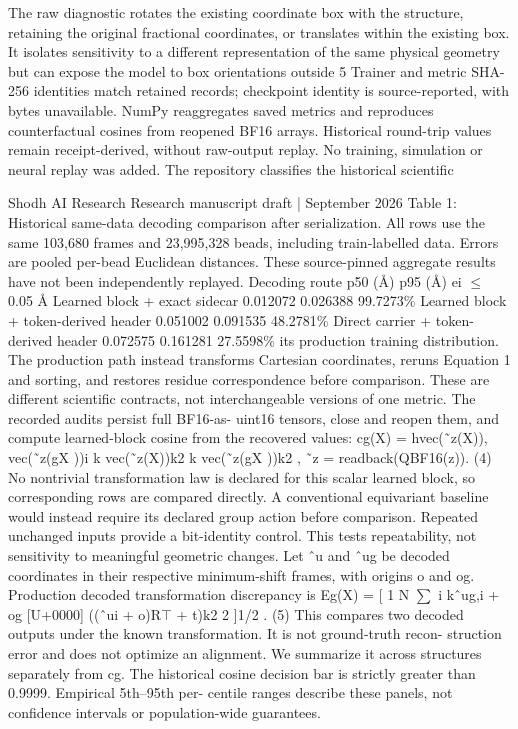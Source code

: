 \documentclass[11pt]{article}
\begin{document}
The raw diagnostic rotates the existing coordinate box with the structure, retaining the original
fractional coordinates, or translates within the existing box. It isolates sensitivity to a different
representation of the same physical geometry but can expose the model to box orientations outside
5
Trainer and metric SHA-256 identities match retained records; checkpoint identity is
source-reported, with bytes unavailable. NumPy reaggregates saved metrics and reproduces
counterfactual cosines from reopened BF16 arrays. Historical round-trip values remain
receipt-derived, without raw-output replay. No training, simulation or neural replay was added.
The repository classifies the historical scientific

Shodh AI Research Research manuscript draft | September 2026
Table 1: Historical same-data decoding comparison after serialization. All rows use the same
103,680 frames and 23,995,328 beads, including train-labelled data. Errors are pooled per-bead
Euclidean distances. These source-pinned aggregate results have not been independently replayed.
Decoding route p50 (Å) p95 (Å) ei \ensuremath{\leq} 0.05 Å
Learned block + exact sidecar 0.012072 0.026388 99.7273\%
Learned block + token-derived header 0.051002 0.091535 48.2781\%
Direct carrier + token-derived header 0.072575 0.161281 27.5598\%
its production training distribution. The production path instead transforms Cartesian coordinates,
reruns Equation 1 and sorting, and restores residue correspondence before comparison. These are
different scientific contracts, not interchangeable versions of one metric.
The recorded audits persist full BF16-as- uint16 tensors, close and reopen them, and compute
learned-block cosine from the recovered values:
cg(X) = hvec(˜z(X)), vec(˜z(gX ))i
k vec(˜z(X))k2 k vec(˜z(gX ))k2
, ˜z = readback(QBF16(z)). (4)
No nontrivial transformation law is declared for this scalar learned block, so corresponding rows
are compared directly. A conventional equivariant baseline would instead require its declared group
action before comparison. Repeated unchanged inputs provide a bit-identity control. This tests
repeatability, not sensitivity to meaningful geometric changes.
Let ˆu and ˆug be decoded coordinates in their respective minimum-shift frames, with origins o and
og. Production decoded transformation discrepancy is
Eg(X) =
[
1
N
\ensuremath{\sum}
i
kˆug,i + og [U+0000] ((ˆui + o)R\ensuremath{\top} + t)k2
2
]1/2
. (5)
This compares two decoded outputs under the known transformation. It is not ground-truth recon-
struction error and does not optimize an alignment. We summarize it across structures separately
from cg. The historical cosine decision bar is strictly greater than 0.9999. Empirical 5th–95th per-
centile ranges describe these panels, not confidence intervals or population-wide guarantees.
\end{document}
